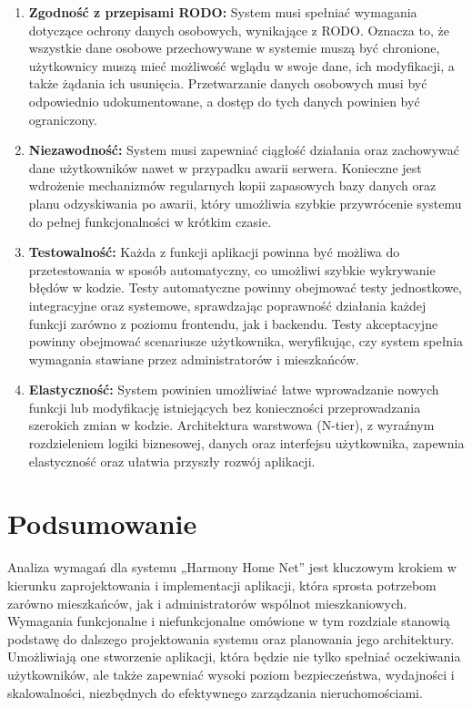 \begin{enumerate}[label=\arabic*.]
	\item \textbf{Zgodność z przepisami RODO:} System musi spełniać wymagania dotyczące ochrony danych osobowych, wynikające z RODO. Oznacza to, że wszystkie dane osobowe przechowywane w systemie muszą być chronione, użytkownicy muszą mieć możliwość wglądu w swoje dane, ich modyfikacji, a także żądania ich usunięcia. Przetwarzanie danych osobowych musi być odpowiednio udokumentowane, a dostęp do tych danych powinien być ograniczony.

	\item \textbf{Niezawodność:} System musi zapewniać ciągłość działania oraz zachowywać dane użytkowników nawet w przypadku awarii serwera. Konieczne jest wdrożenie mechanizmów regularnych kopii zapasowych bazy danych oraz planu odzyskiwania po awarii, który umożliwia szybkie przywrócenie systemu do pełnej funkcjonalności w krótkim czasie.

	\item \textbf{Testowalność:} Każda z funkcji aplikacji powinna być możliwa do przetestowania w sposób automatyczny, co umożliwi szybkie wykrywanie błędów w kodzie. Testy automatyczne powinny obejmować testy jednostkowe, integracyjne oraz systemowe, sprawdzając poprawność działania każdej funkcji zarówno z poziomu frontendu, jak i backendu. Testy akceptacyjne powinny obejmować scenariusze użytkownika, weryfikując, czy system spełnia wymagania stawiane przez administratorów i mieszkańców.

	\item \textbf{Elastyczność:} System powinien umożliwiać łatwe wprowadzanie nowych funkcji lub modyfikację istniejących bez konieczności przeprowadzania szerokich zmian w kodzie. Architektura warstwowa (N-tier), z wyraźnym rozdzieleniem logiki biznesowej, danych oraz interfejsu użytkownika, zapewnia elastyczność oraz ułatwia przyszły rozwój aplikacji.
	
\end{enumerate}

\section{Podsumowanie}

Analiza wymagań dla systemu „Harmony Home Net” jest kluczowym krokiem w kierunku zaprojektowania i implementacji aplikacji, która sprosta potrzebom zarówno mieszkańców, jak i administratorów wspólnot mieszkaniowych. Wymagania funkcjonalne i niefunkcjonalne omówione w tym rozdziale stanowią podstawę do dalszego projektowania systemu oraz planowania jego architektury. Umożliwiają one stworzenie aplikacji, która będzie nie tylko spełniać oczekiwania użytkowników, ale także zapewniać wysoki poziom bezpieczeństwa, wydajności i skalowalności, niezbędnych do efektywnego zarządzania nieruchomościami.
